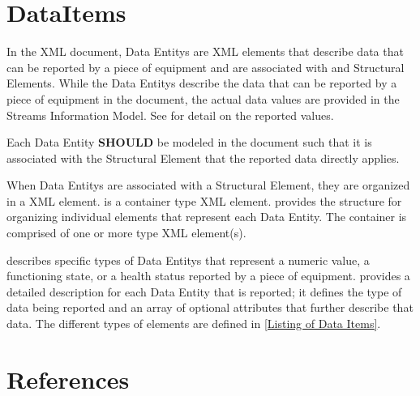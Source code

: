 \section{DataItems}
\label{sec:DataItems}

In the  \gls{XML} document, \glspl{Data Entity} are \gls{XML} elements that describe data that can be reported by a piece of equipment and are associated with  and  \glspl{Structural Element}.   While the \glspl{Data Entity} describe the data that can be reported by a piece of equipment in the  document, the actual data values are provided in the \gls{Streams Information Model}.   See  for detail on the reported values.

Each \gls{Data Entity} \textbf{SHOULD} be modeled in the  document such that it is associated with the \gls{Structural Element} that the reported data directly applies.

When \glspl{Data Entity} are associated with a \gls{Structural Element}, they are organized in a  \gls{XML} element.    is a container type \gls{XML} element.   provides the structure for organizing individual  elements that represent each \gls{Data Entity}. The  container is comprised of one or more  type \gls{XML} element(s).

 describes specific types of \glspl{Data Entity} that represent a numeric value, a functioning state, or a health status reported by a piece of equipment.    provides a detailed description for each \gls{Data Entity} that is reported; it defines the type of data being reported and an array of optional attributes that further describe that data.   The different types of  elements are defined in \ref{Listing of Data Items}.











\section{References}
\label{sec:References}

